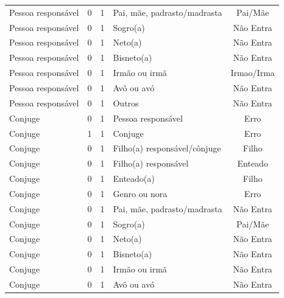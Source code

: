 \documentclass[
	12pt,				%
	openright,			%
	twoside,			%
	a4paper,			%
	english,			%
	french,				%
	spanish,			%
	brazil				%
	]{abntex2}
\begin{document}
\begin{anexosenv}
\begin{longtable}{@{}lcclc@{}}
Pessoa responsável           & 0         & 1        & Pai, mãe, padrasto/madrasta  & Pai/Mãe         \\
Pessoa responsável           & 0         & 1        & Sogro(a)                     & Não Entra       \\
Pessoa responsável           & 0         & 1        & Neto(a)                      & Não Entra       \\
Pessoa responsável           & 0         & 1        & Bisneto(a)                   & Não Entra       \\
Pessoa responsável           & 0         & 1        & Irmão ou irmã                & Irmao/Irma      \\
Pessoa responsável           & 0         & 1        & Avô ou avó                   & Não Entra       \\
Pessoa responsável           & 0         & 1        & Outros                       & Não Entra       \\
Conjuge                      & 0         & 1        & Pessoa responsável           & Erro            \\
Conjuge                      & 1         & 1        & Conjuge                      & Erro            \\
Conjuge                      & 0         & 1        & Filho(a) responsável/cônjuge & Filho           \\
Conjuge                      & 0         & 1        & Filho(a) responsável         & Enteado         \\
Conjuge                      & 0         & 1        & Enteado(a)                   & Filho           \\
Conjuge                      & 0         & 1        & Genro ou nora                & Erro            \\
Conjuge                      & 0         & 1        & Pai, mãe, padrasto/madrasta  & Não Entra       \\
Conjuge                      & 0         & 1        & Sogro(a)                     & Pai/Mãe         \\
Conjuge                      & 0         & 1        & Neto(a)                      & Não Entra       \\
Conjuge                      & 0         & 1        & Bisneto(a)                   & Não Entra       \\
Conjuge                      & 0         & 1        & Irmão ou irmã                & Não Entra       \\
Conjuge                      & 0         & 1        & Avô ou avó                   & Não Entra       \\

\end{longtable}
\end{anexosenv}
\end{document}

